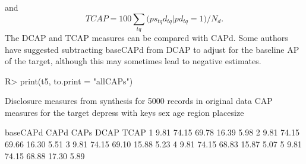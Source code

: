 \documentclass[12pt]{article}
\begin{document}
 and
\begin{equation}
   \nonumber  TCAP = 100\sum\limits_{tq}{(ps_{tq}}d_{tq} | pd_{tq} = 1)/N_d.
\end{equation}
The DCAP and TCAP measures can be compared with CAPd. Some authors \cite{little2022,lotte} have suggested subtracting baseCAPd from DCAP to adjust for the baseline AP of the target, although this may sometimes lead to negative estimates.
\begin{Schunk}
\begin{Sinput}
R> print(t5, to.print = "allCAPs")
\end{Sinput}
\begin{Soutput}
Disclosure measures from synthesis for 5000 records in original data
CAP measures for the target depress with keys
sex age region placesize 

  baseCAPd  CAPd  CAPs  DCAP TCAP
1     9.81 74.15 69.78 16.39 5.98
2     9.81 74.15 69.66 16.30 5.51
3     9.81 74.15 69.10 15.88 5.23
4     9.81 74.15 68.83 15.87 5.07
5     9.81 74.15 68.88 17.30 5.89
\end{Soutput}
\end{Schunk}
\end{document}

